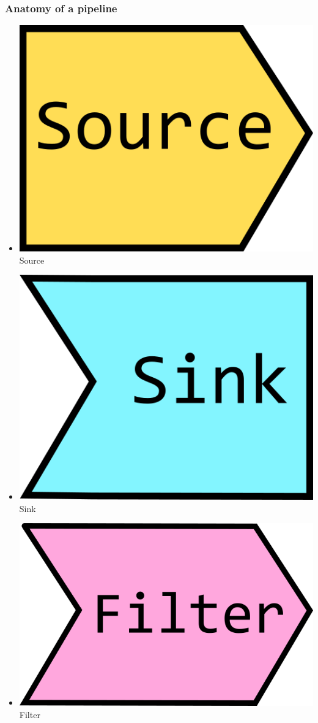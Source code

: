 \documentclass[aspectratio=169]{beamer}
\begin{document}
\begin{frame}
  \frametitle{Anatomy of a pipeline}
  
  \begin{itemize}
  \item \includegraphics[height=.04\textheight]{pipelinesgfx/source.png} Source
  \item \includegraphics[height=.04\textheight]{pipelinesgfx/sink.png} Sink
  \item \includegraphics[height=.04\textheight]{pipelinesgfx/filter.png} Filter
  \end{itemize}
  

\end{frame}
\end{document}
